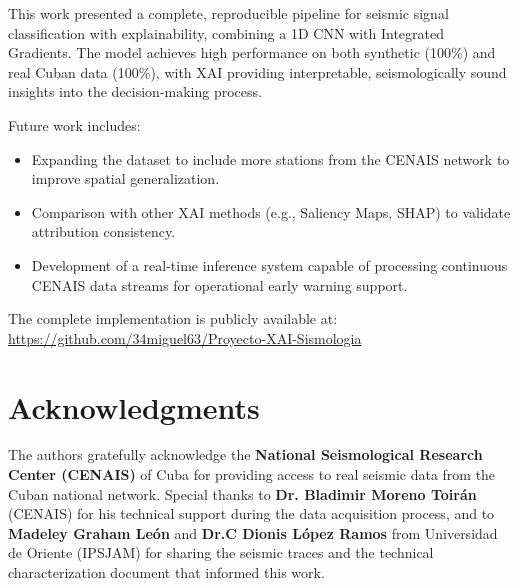 \documentclass[10pt,a4paper]{article}
\begin{document}
This work presented a complete, reproducible pipeline for seismic signal classification with explainability, combining a 1D CNN with Integrated Gradients. The model achieves high performance on both synthetic (100\%) and real Cuban data (100\%), with XAI providing interpretable, seismologically sound insights into the decision-making process.

Future work includes:
\begin{itemize}
\item Expanding the dataset to include more stations from the CENAIS network to improve spatial generalization.
\item Comparison with other XAI methods (e.g., Saliency Maps, SHAP) to validate attribution consistency.
\item Development of a real-time inference system capable of processing continuous CENAIS data streams for operational early warning support.
\end{itemize}

The complete implementation is publicly available at: \url{https://github.com/34miguel63/Proyecto-XAI-Sismologia}

\section*{Acknowledgments}

The authors gratefully acknowledge the \textbf{National Seismological Research Center (CENAIS)} of Cuba for providing access to real seismic data from the Cuban national network. Special thanks to \textbf{Dr. Bladimir Moreno Toirán} (CENAIS) for his technical support during the data acquisition process, and to \textbf{Madeley Graham León} and \textbf{Dr.C Dionis López Ramos} from Universidad de Oriente (IPSJAM) for sharing the seismic traces and the technical characterization document that informed this work.
\end{document}
